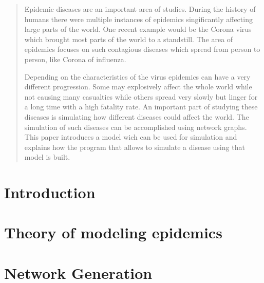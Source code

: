 \documentclass[oneside]{ausarbeitung}
\begin{document}
\begin{abstract}
 Epidemic diseases are an important area of studies. During the history of humans there
 were multiple instances of epidemics singificantly affecting large parts of the world.
 One recent example would be the Corona virus which brought most parts of the world to a 
 standstill. The area of epidemics focuses on such contagious diseases which spread from
 person to person, like Corona of influenza.

 Depending on the characteristics of the virus epidemics can have a very different progression.
 Some may explosively affect the whole world while not causing many casualties while others
 spread very slowly but linger for a long time with a high fatality rate. An important 
 part of studying these diseases is simulating how different diseases could affect the world.
 The simulation of such diseases can be accomplished using network graphs. This paper introduces
 a model wich can be used for simulation and explains how the program that allows to simulate
 a disease using that model is built.
\end{abstract}
\cleardoublepage
\tableofcontents

\listoffigures



\cleardoublepage
{}
\setcounter{page}{1}

\algrenewcommand{}
\algrenewcommand{}


\chapter{Introduction}
\label{cha:introduction}


\chapter{Theory of modeling epidemics}
\label{cha:general_principles}


\chapter{Network Generation}
\label{cha:network_generation}

\end{document}
